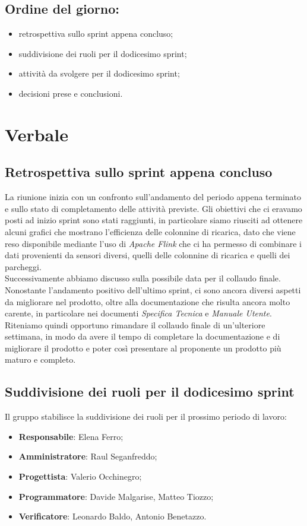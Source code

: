 \documentclass[italian,12pt]{article}
\begin{document}
\subsection*{Ordine del giorno:}
\begin{itemize}
	\item retrospettiva sullo sprint appena concluso;
	\item suddivisione dei ruoli per il dodicesimo sprint;
	\item attività da svolgere per il dodicesimo sprint;
	\item decisioni prese e conclusioni.
\end{itemize}


\newpage

\section{Verbale}

\subsection{Retrospettiva sullo sprint appena concluso}
La riunione inizia con un confronto sull'andamento del periodo appena terminato e sullo stato di completamento delle attività previste. Gli obiettivi che ci eravamo posti ad inizio sprint sono stati raggiunti, in particolare siamo riusciti ad ottenere alcuni grafici che mostrano l'efficienza delle colonnine di ricarica, dato che viene reso disponibile mediante l'uso di \textit{Apache Flink} che ci ha permesso di combinare i dati provenienti da sensori diversi, quelli delle colonnine di ricarica e quelli dei parcheggi. \\
Successivamente abbiamo discusso sulla possibile data per il collaudo finale. Nonostante l'andamento positivo dell'ultimo sprint, ci sono ancora diversi aspetti da migliorare nel prodotto, oltre alla documentazione che risulta ancora molto carente, in particolare nei documenti \textit{Specifica Tecnica} e \textit{Manuale Utente}. Riteniamo quindi opportuno rimandare il collaudo finale di un'ulteriore settimana, in modo da avere il tempo di completare la documentazione e di migliorare il prodotto e poter così presentare al proponente un prodotto più maturo e completo.

\subsection{Suddivisione dei ruoli per il dodicesimo sprint}
Il gruppo stabilisce la suddivisione dei ruoli per il prossimo periodo di lavoro:
\begin{itemize}
	\item \textbf{Responsabile}: Elena Ferro;
	\item \textbf{Amministratore}: Raul Seganfreddo;
	\item \textbf{Progettista}: Valerio Occhinegro;
	\item \textbf{Programmatore}: Davide Malgarise, Matteo Tiozzo;
	\item \textbf{Verificatore}: Leonardo Baldo, Antonio Benetazzo.
\end{itemize}
\end{document}
